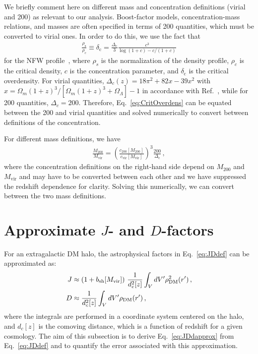 We briefly comment here on different mass and concentration definitions (virial and 200) as relevant to our analysis.   Boost-factor models, concentration-mass relations, and masses are often specified in terms of 200 quantities, which must be converted to virial ones. In order to do this, we use the fact that
\begin{equation}\begin{aligned}
\frac{\rho_\text{s}}{\rho_c} \equiv \delta_\mathrm{c} = \frac{\Delta_\text{c}}{3}\frac{c^3}{\log{(1+c)}-c/(1+c)}
\label{eq:CritOverdens}
\end{aligned}\end{equation}
for the NFW profile~\cite{Navarro:1995iw}, where $\rho_s$ is the normalization of the density profile, $\rho_c$ is the critical density, $c$ is the concentration parameter, and $\delta_\mathrm{c}$ is the critical overdensity.  For virial quantities, $\Delta_c(z) = 18\pi^2 +82x-39x^2$ with $x = \Omega_{m}(1+z)^3/[\Omega_{m}(1+z)^3 + \Omega_{\Lambda}]-1$ in accordance with Ref.~\cite{Bryan:1997dn}, while for 200 quantities, $\Delta_c = 200$.  Therefore, Eq.~\ref{eq:CritOverdens} can be equated between the 200 and virial quantities and solved numerically to convert between definitions of the concentration.

For different mass definitions, we have 
\begin{equation}\begin{aligned}
\frac{M_{200}}{M_\text{vir}} = \left(\frac{c_{200}[M_{200}]}{c_\text{vir}[M_\text{vir}]}\right)^3\frac{200}{\Delta_\text{c}} \, ,
\label{eq:MassConvert}
\end{aligned}\end{equation}
where the concentration definitions on the right-hand side depend on $M_{200}$ and $M_\text{vir}$ and may have to be converted between each other and we have suppressed the redshift dependence for clarity.  Solving this numerically, we can convert between the two mass definitions.

\section{Approximate $J$- and $D$-factors}

For an extragalactic DM halo, the astrophysical factors in Eq.~\ref{eq:JDdef} can be approximated as:
\begin{equation}\begin{aligned}
J &\approx \left(1+b_\text{sh}[M_\text{vir}]\right)\, \frac{1}{d_c^2[z]} \int_V dV' \rho_{\rm DM}^2(r') \,, \\
D &\approx \frac{1}{d_c^2[z]} \int_V dV' \rho_{\rm DM}(r')\,,
\vspace{0.5in}
\label{eq:JDdapprox}
\end{aligned}\end{equation}
where the integrals are performed in a coordinate system centered on the halo, and $d_c[z]$ is the comoving distance, which is a function of redshift for a given cosmology.  The aim of this subsection is to derive Eq.~\ref{eq:JDdapprox} from Eq.~\ref{eq:JDdef} and to quantify the error associated with this approximation. 

